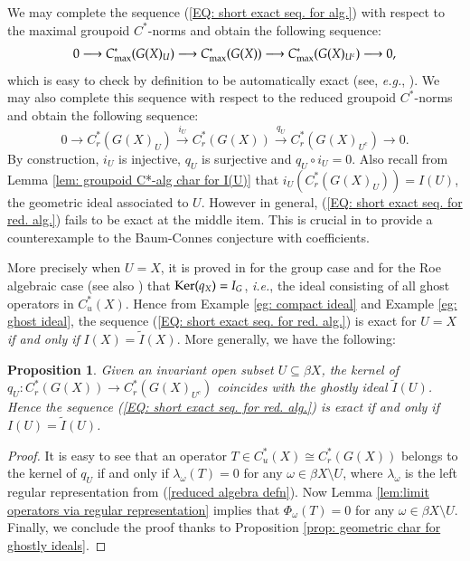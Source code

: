 \documentclass[12pt, a4paper]{amsart}
\numberwithin{equation}{section}
\newtheorem{prop}[thm]{Proposition}
\theoremstyle{definition}
\theoremstyle{remark}
\begin{document}
We may complete the sequence (\ref{EQ: short exact seq. for alg.}) with respect to the maximal groupoid $C^*$-norms and obtain the following sequence:
\begin{equation}\label{EQ: short exact seq. for max. alg.}
0 \longrightarrow C^*_{\rm max}(G(X)_U) \longrightarrow C^*_{\rm max}(G(X)) \longrightarrow C^*_{\rm max}(G(X)_{U^c}) \longrightarrow 0,
\end{equation}
which is easy to check by definition to be automatically exact (see, \emph{e.g.}, \cite[Lemma 2.10]{MRW96}). We may also complete this sequence with respect to the reduced groupoid $C^*$-norms and obtain the following sequence:
\begin{equation}\label{EQ: short exact seq. for red. alg.}
0 \longrightarrow C^*_r(G(X)_U) \stackrel{i_U}{\longrightarrow} C^*_r(G(X)) \stackrel{q_U}{\longrightarrow} C^*_r(G(X)_{U^c}) \longrightarrow 0.
\end{equation}
By construction, $i_U$ is injective, $q_U$ is surjective and $q_U \circ i_U =0$. Also recall from Lemma \ref{lem: groupoid C*-alg char for I(U)} that $i_U(C^*_r(G(X)_U)) = I(U)$, the geometric ideal associated to $U$. However in general, (\ref{EQ: short exact seq. for red. alg.}) fails to be exact at the middle item. This is crucial in \cite{HLS02} to provide a counterexample to the Baum-Connes conjecture with coefficients.

More precisely when $U=X$, it is proved in \cite[Proposition 2.11]{Roe05} for the group case and \cite[Proposition 4.4]{FW14} for the Roe algebraic case (see also \cite[Proposition 8.2]{SW17}) that ${\rm Ker}(q_X)=I_G$, \emph{i.e.}, the ideal consisting of all ghost operators in $C^*_u(X)$. Hence from Example \ref{eg: compact ideal} and Example \ref{eg: ghost ideal}, the sequence (\ref{EQ: short exact seq. for red. alg.}) is exact for $U=X$ \emph{if and only if} $I(X) = \tilde{I}(X)$. 
More generally, we have the following:

\begin{prop}\label{prop: char for Ker qU}
Given an invariant open subset $U \subseteq \beta X$, the kernel of $q_U: C^*_r(G(X)) \to C^*_r(G(X)_{U^c})$ coincides with the ghostly ideal $\tilde{I}(U)$. Hence the sequence (\ref{EQ: short exact seq. for red. alg.}) is exact \emph{if and only if} $I(U) = \tilde{I}(U)$.
\end{prop}

\begin{proof}
It is easy to see that an operator $T \in C^*_u(X) \cong C^*_r(G(X))$ belongs to the kernel of $q_U$ if and only if $\lambda_\omega(T)=0$ for any $\omega \in \beta X \setminus U$, where $\lambda_\omega$ is the left regular representation from (\ref{reduced algebra defn}). Now Lemma \ref{lem:limit operators via regular representation} implies that $\Phi_\omega(T) = 0$ for any $\omega \in \beta X \setminus U$. Finally, we conclude the proof thanks to Proposition \ref{prop: geometric char for ghostly ideals}.
\end{proof}
\end{document}
